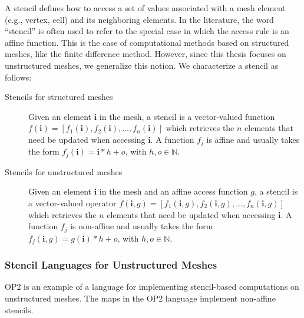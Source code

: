A stencil defines how to access a set of values associated with a mesh element (e.g., vertex, cell) and its neighboring elements. In the literature, the word ``stencil'' is often used to refer to the special case in which the access rule is an affine function. This is the case of computational methods based on structured meshes, like the finite difference method. However, since this thesis focuses on unstructured meshes, we generalize this notion. We characterize a stencil as follows:

\begin{description}
\item[Stencils for structured meshes] Given an element $\boldsymbol{i}$ in the mesh, a stencil is a vector-valued function $f(\boldsymbol{i}) = [f_1(\boldsymbol{i}), f_2(\boldsymbol{i}), ..., f_n(\boldsymbol{i})]$ which retrieves the $n$ elements that need be updated when accessing $\boldsymbol{i}$. A function $f_j$ is affine and usually takes the form $f_j(\boldsymbol{i}) = \boldsymbol{i}*h + o$, with $h, o \in \mathbb{N}$.
\item[Stencils for unstructured meshes] Given an element $\boldsymbol{i}$ in the mesh and an affine access function $g$, a stencil is a vector-valued operator $f(\boldsymbol{i}, g) = [f_1(\boldsymbol{i}, g), f_2(\boldsymbol{i}, g), ..., f_n(\boldsymbol{i}, g)]$ which retrieves the $n$ elements that need be updated when accessing $\boldsymbol{i}$. A function $f_j$ is non-affine and usually takes the form $f_j(\boldsymbol{i}, g) = g(\boldsymbol{i})*h + o$, with $h, o \in \mathbb{N}$.
\end{description}

\subsubsection{Stencil Languages for Unstructured Meshes}
OP2 is an example of a language for implementing stencil-based computations on unstructured meshes. The maps in the OP2 language implement non-affine stencils. 


